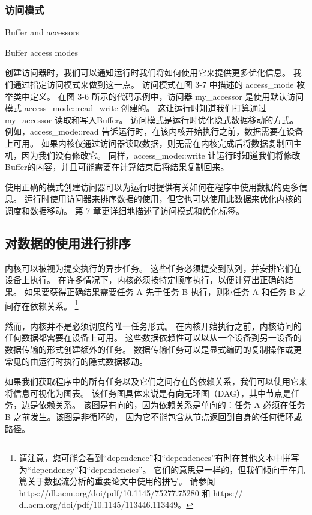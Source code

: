 \subsubsection{访问模式}
{\color{red} Buffer and accessors }

{\color{red} Buffer access modes}

创建访问器时，我们可以通知运行时我们将如何使用它来提供更多优化信息。 我们通过指定访问模式来做到这一点。 
访问模式在图 3-7 中描述的 access\_mode 枚举类中定义。 
在图 3-6 所示的代码示例中，访问器 my\_accessor 是使用默认访问模式 access\_mode::read\_write 创建的。 
这让运行时知道我们打算通过 my\_accessor 读取和写入Buffer。 访问模式是运行时优化隐式数据移动的方式。 
例如，access\_mode::read 告诉运行时，在该内核开始执行之前，数据需要在设备上可用。 
如果内核仅通过访问器读取数据，则无需在内核完成后将数据复制回主机，因为我们没有修改它。 
同样，access\_mode::write 让运行时知道我们将修改Buffer的内容，并且可能需要在计算结束后将结果复制回来。

使用正确的模式创建访问器可以为运行时提供有关如何在程序中使用数据的更多信息。 
运行时使用访问器来排序数据的使用，但它也可以使用此数据来优化内核的调度和数据移动。 
第 7 章更详细地描述了访问模式和优化标签。

\subsection{对数据的使用进行排序}
内核可以被视为提交执行的异步任务。 这些任务必须提交到队列，并安排它们在设备上执行。 
在许多情况下，内核必须按特定顺序执行，以便计算出正确的结果。 
如果要获得正确结果需要任务 A 先于任务 B 执行，则称任务 A 和任务 B 之间存在依赖关系。
\footnote{请注意，您可能会看到“dependence”和“dependences”有时在其他文本中拼写为“dependency”和“dependencies”。
它们的意思是一样的，但我们倾向于在几篇关于数据流分析的重要论文中使用的拼写。
请参阅 https://dl.acm.org/doi/pdf/10.1145/75277.75280 
和 https:// dl.acm.org/doi/pdf/10.1145/113446.113449。}

然而，内核并不是必须调度的唯一任务形式。 在内核开始执行之前，内核访问的任何数据都需要在设备上可用。 
这些数据依赖性可以以从一个设备到另一设备的数据传输的形式创建额外的任务。 
数据传输任务可以是显式编码的复制操作或更常见的由运行时执行的隐式数据移动。

如果我们获取程序中的所有任务以及它们之间存在的依赖关系，我们可以使用它来将信息可视化为图表。 
该任务图具体来说是有向无环图（DAG），其中节点是任务，边是依赖关系。 
该图是有向的，因为依赖关系是单向的：任务 A 必须在任务 B 之前发生。该图是非循环的，
因为它不能包含从节点返回到自身的任何循环或路径。

